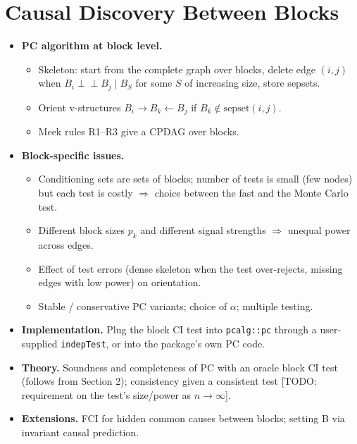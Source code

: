 \documentclass[10pt,leqno]{amsart}
\newcommand{\todo}[1]{{\color{red}[TODO: #1]}}
\newcommand{\ci}{\perp\!\!\!\perp}          %
\begin{document}
\section{Causal Discovery Between Blocks}
\begin{itemize}
\item \textbf{PC algorithm at block level.}
  \begin{itemize}
  \item Skeleton: start from the complete graph over blocks, delete edge $(i,j)$ when
    $B_i\ci B_j\mid B_S$ for some $S$ of increasing size, store sepsets.
  \item Orient v-structures $B_i\to B_k\leftarrow B_j$ if $B_k\notin\mathrm{sepset}(i,j)$.
  \item Meek rules R1--R3 give a CPDAG over blocks.
  \end{itemize}
\item \textbf{Block-specific issues.}
  \begin{itemize}
  \item Conditioning sets are sets of blocks; number of tests is small (few
    nodes) but each test is costly $\Rightarrow$ choice between the fast and the
    Monte Carlo test.
  \item Different block sizes $p_k$ and different signal strengths $\Rightarrow$
    unequal power across edges.
  \item Effect of test errors (dense skeleton when the test over-rejects, missing
    edges with low power) on orientation.
  \item Stable / conservative PC variants; choice of $\alpha$; multiple testing.
  \end{itemize}
\item \textbf{Implementation.} Plug the block CI test into \texttt{pcalg::pc} through
  a user-supplied \texttt{indepTest}, or into the package's own PC code.
\item \textbf{Theory.} Soundness and completeness of PC with an oracle block CI test
  (follows from Section 2); consistency given a consistent test \todo{requirement
  on the test's size/power as $n\to\infty$}.
\item \textbf{Extensions.} FCI for hidden common causes between blocks; setting B
  via invariant causal prediction.
\end{itemize}

\end{document}
